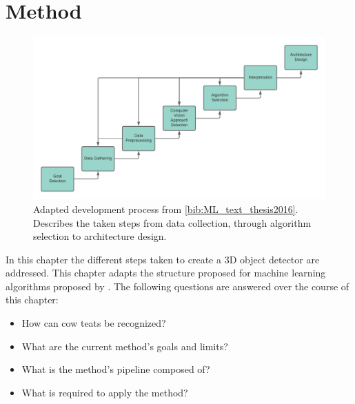 \chapter{Method}\label{chap:design}
\begin{figure}[!ht]
        \centering
        \includegraphics[width=1\textwidth]{images/adapted_development_process.png}
        \caption{Adapted development process from \ref{bib:ML_text_thesis2016}. Describes the taken steps from data collection, through algorithm selection to architecture design.}
        \label{fig:development_design}
\end{figure}
In this chapter the different steps taken to create a 3D object detector are addressed. 
This chapter adapts the structure proposed for machine learning algorithms proposed by \cite{luckert2016using}.
The following questions are answered over the course of this chapter:
\begin{itemize}
    \item How can cow teats be recognized?
    \item What are the current method's goals and limits?
    \item What is the method's pipeline composed of?
    \item What is required to apply the method?
\end{itemize}


